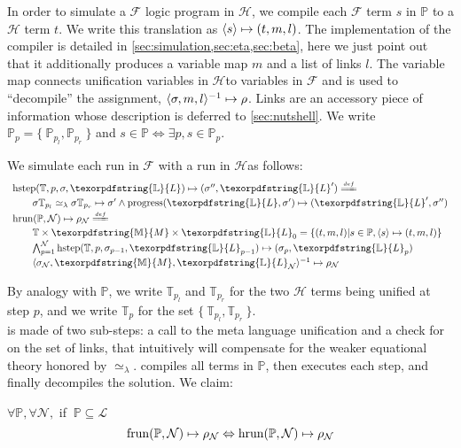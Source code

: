 \documentclass[sigconf,natbib=false,review]{acmart}
\newcommand{\UnifRel}{\ensuremath{\simeq}}
\newcommand{\Ue}{\ensuremath{\UnifRel_\lambda}\xspace}
\newcommand{\llambda}{\ensuremath{\mathcal{L}}\xspace}
\newcommand{\Fo}{\texorpdfstring{\ensuremath{\mathcal{F}\xspace}}{F}} %
\newcommand{\Ho}{\texorpdfstring{\ensuremath{\mathcal{H}}\xspace}{H}}
\newcommand{\linkStore}{\texorpdfstring{\ensuremath{\mathbb{L}}\xspace}{L}}
\newcommand{\mapStore}{\texorpdfstring{\ensuremath{\mathbb{M}}\xspace}{M}}
\newcommand{\foUnifPb}{\ensuremath{\mathbb{P}}\xspace}
\newcommand{\hoUnifPb}{\ensuremath{\mathbb{T}}\xspace}
\begin{document}
\noindent
In order to simulate a \Fo{} logic program in \Ho{}, we compile
each \Fo{} term $s$ in \foUnifPb to a \Ho{} term $t$.
We write this translation as $\langle s \rangle\mapsto(t,m,l)$. The implementation of the compiler
is detailed in \cref{sec:simulation,sec:eta,sec:beta}, here we just point
out that it additionally produces a variable map $m$ and a list of links $l$.
The variable map connects unification variables in \Ho to variables
in \Fo{} and is used to ``decompile'' the assignment,
$\langle \sigma,m,l \rangle^{-1}\mapsto \rho$. Links are an accessory piece of information whose
description is deferred to \cref{sec:nutshell}.
We write $\foUnifPb_p = \{~ \foUnifPb_{p_l}, \foUnifPb_{p_r} ~\}$
and $s \in \foUnifPb \Leftrightarrow \exists p, s \in \foUnifPb_p$.

We simulate each run in \Fo{} with a run in \Ho as follows:
%
$$
\begin{array}{l}
\stepH{\hoUnifPb}{p}{\sigma}{\linkStore}{\sigma''}{\linkStore'} \deff\vspace{2pt}\\
  \qquad\stepHD{\hoUnifPb}{p}{\sigma}{\sigma'}{\sigma''}{\linkStore}\vspace{2pt}\\
  \runH{\foUnifPb}{\mathcal{N}}{\rho} \deff \vspace{2pt}\\
  \qquad \hoUnifPb \times \mapStore \times \linkStore_0 = \{ (t,m,l) | s \in \foUnifPb, \C{s}{t}{m}{l} \}\vspace{2pt}\\
  \qquad \runHD{\hoUnifPb}{\mathcal{N}}{\linkStore}\vspace{2pt}\\
  \qquad \D{\sigma_{\mathcal{N}}}{\mapStore}{\linkStore_{\mathcal{N}}}{\rho_{\mathcal{N}}}
\end{array}
$$

\noindent
By analogy with \foUnifPb, we write $\hoUnifPb_{p_l}$ and $\hoUnifPb_{p_r}$
for the two \Ho{} terms being unified at step $p$, and we write $\hoUnifPb_p$
for the set $\{~ \hoUnifPb_{p_l}, \hoUnifPb_{p_r} ~\}$.\\
\hstep{} is made of two sub-steps: a call to the meta language
unification and a check for \progress{} on the set of links, that intuitively
will compensate for the weaker equational theory honored by \Ue.
\hrun{} compiles all terms in \foUnifPb{}, then executes each step, and
finally decompiles the solution.
We claim:

\begin{proposition}\label{prop:simulation}
$\forall \foUnifPb, \forall \mathcal{N},$ if $~\foUnifPb \subseteq \llambda$
$$
  \runF{\foUnifPb}{\mathcal{N}}{\rho}
  \Leftrightarrow
  \runH{\foUnifPb}{\mathcal{N}}{\rho}
$$
\end{proposition}
\end{document}
